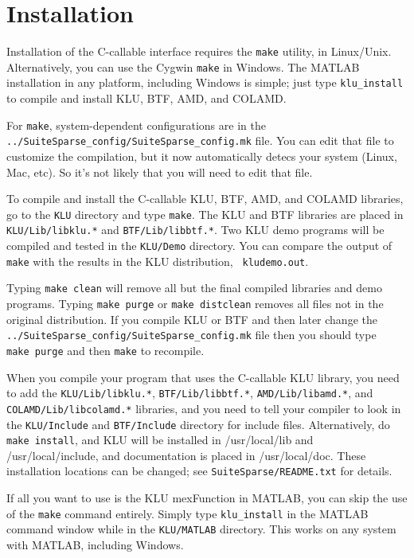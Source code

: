 \documentclass[11pt]{article}
\begin{document}
\section{Installation}
\label{Install}

Installation of the C-callable interface requires the {\tt make} utility, in
Linux/Unix.  Alternatively, you can use the Cygwin {\tt make} in Windows.
The MATLAB installation in any platform, including Windows is simple; just
type {\tt klu\_install} to compile and install KLU, BTF, AMD, and COLAMD.

For {\tt make}, system-dependent configurations are in the {\tt
../SuiteSparse\_config/SuiteSparse\_config.mk} file.
You can edit that file to customize the
compilation, but it now automatically detecs your system (Linux, Mac, etc).
So it's not likely that you will need to edit that file.

To compile and install the C-callable KLU, BTF, AMD, and COLAMD libraries, go
to the {\tt KLU} directory and type {\tt make}.  The KLU and BTF libraries are
placed in {\tt KLU/Lib/libklu.*} and {\tt BTF/Lib/libbtf.*}.
Two KLU demo
programs will be compiled and tested in the {\tt KLU/Demo} directory.  You can
compare the output of {\tt make} with the results in the KLU distribution, {\tt
kludemo.out}.

Typing {\tt make clean} will remove all but the final compiled libraries and
demo programs.  Typing {\tt make purge} or {\tt make distclean} removes all
files not in the original distribution.  If you compile KLU or BTF and then
later change the {\tt ../SuiteSparse\_config/SuiteSparse\_config.mk}
file then you should type {\tt
make purge} and then {\tt make} to recompile.

When you compile your program that uses the C-callable KLU library, you need to
add the {\tt KLU/Lib/libklu.*}, {\tt BTF/Lib/libbtf.*}, {\tt AMD/Lib/libamd.*},
and {\tt COLAMD/Lib/libcolamd.*} libraries, and you need to tell your compiler to
look in the {\tt KLU/Include} and {\tt BTF/Include} directory for include
files.
Alternatively, do {\tt make install}, and KLU will be installed in
/usr/local/lib and /usr/local/include, and documentation is placed in
/usr/local/doc.  These installation locations can be changed;
see {\tt SuiteSparse/README.txt} for details.

If all you want to use is the KLU mexFunction in MATLAB, you can skip the use
of the {\tt make} command entirely.  Simply type {\tt klu\_install} in the
MATLAB command window while in the {\tt KLU/MATLAB} directory.  This works on
any system with MATLAB, including Windows.
\end{document}
